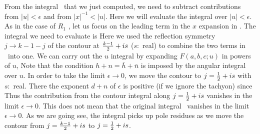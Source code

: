 {}From the integral \integral\  that
we just computed, we need to subtract contributions
from $|u| < \epsilon$ and from $|x|^{-1} < |u|$. Here we will evaluate
the integral over $|u| < \epsilon$. As in the case of $R_1$ \integral ,
 let
 us focus on the leading term in the $x$ expansion in \regionone .
The integral we need to evaluate is
\eqn{}
Here we used the reflection symmetry $j \rightarrow k-1-j$
of the contour at ${k-1\over 2} + is$ ($s:$ real) to combine the
two terms in \monodinv\ into one.
We can carry out the $u$ integral by expanding $F(a,b,c;u)$ in
powers of $u$,
\eqn{}
Note that the condition
 $h+n = \bar{h}+\bar{n}$ is imposed by the angular integral over $u$.
In order to take the limit $\epsilon \rightarrow 0$,
we move the contour to $j = {1\over 2} + is$ with $s:$ real.
There the exponent $d+n$ of
$\epsilon$ is positive (if we ignore the tachyon) since
\eqn{}
Thus the contribution from the contour integral
along  $j={1\over 2} + is$ vanishes in the limit $\epsilon \rightarrow
0$. This does not mean that the original integral \intadd\ vanishes
in the limit $\epsilon \rightarrow 0$. As we are going
see, the integral picks up pole residues as we move the contour
from $j = {k-1\over 2} + is$ to $j = {1\over 2} + is$.


